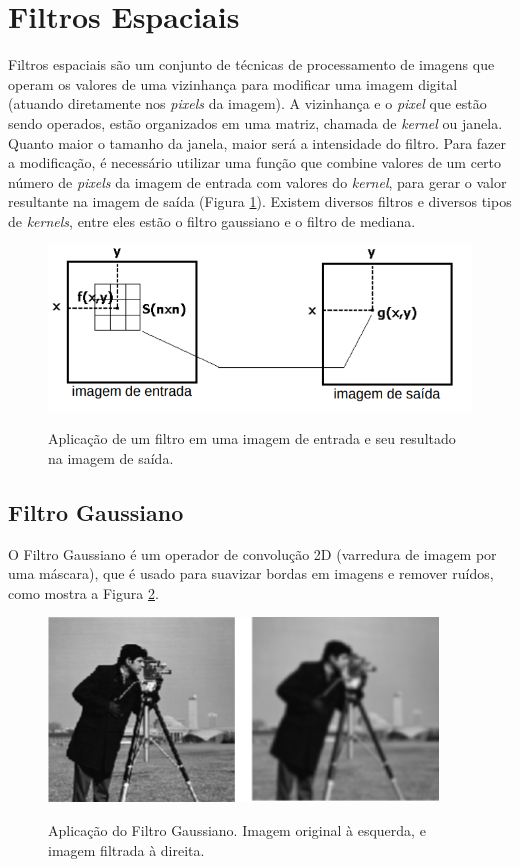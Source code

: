 \iffalse
\section{Filtros Espaciais}
Filtros espaciais são um conjunto de técnicas de processamento de imagens que operam os valores de uma vizinhança para modificar uma imagem digital (atuando diretamente nos \textit{pixels} da imagem). 
A vizinhança e o \textit{pixel} que estão sendo operados, estão organizados em uma matriz, chamada de \textit{kernel} ou janela. 
Quanto maior o tamanho da janela, maior será a intensidade do filtro.
Para fazer a modificação, é necessário utilizar uma função que combine valores de um certo número de \textit{pixels} da imagem de entrada com valores do \textit{kernel}, para gerar o valor resultante na imagem de saída (Figura \ref{fig:image_filter}).
Existem diversos filtros e diversos tipos de \textit{kernels}, entre eles estão o filtro gaussiano e o filtro de mediana.

\begin{figure}[H]
    \centering
    \caption{Aplicação de um filtro em uma imagem de entrada e seu resultado na imagem de saída.}
    \includegraphics[scale=0.4]{dados/figuras/image_filters.png}
    \label{fig:image_filter}
\end{figure}


\subsection{Filtro Gaussiano}
\label{sec:gaussian_filter}

O Filtro Gaussiano é um operador de convolução 2D (varredura de imagem por uma máscara), que é usado para suavizar bordas em imagens e remover ruídos, como mostra a Figura \ref{fig:gaussian_filter}.

\begin{figure}[H]
    \centering
    \caption{Aplicação do Filtro Gaussiano. Imagem original à esquerda, e imagem filtrada à direita.}
    \includegraphics[scale=0.8]{dados/figuras/image_gaussian_filter.png}
    \label{fig:gaussian_filter}    
\end{figure}


